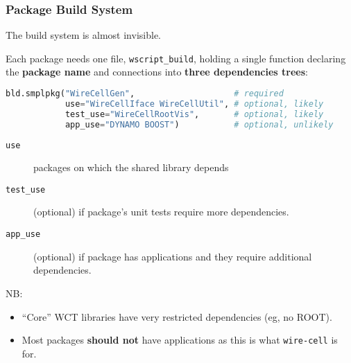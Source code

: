 \documentclass[xcolor=dvipsnames]{beamer}
\begin{document}
\begin{frame}[fragile]
  \frametitle{Package Build System}
  \footnotesize
  The build system is almost invisible.

  Each package needs one file, \texttt{wscript\_build}, holding a single
  function declaring the \textbf{package name} and connections into
  \textbf{three dependencies trees}:

\begin{lstlisting}[language=python]
bld.smplpkg("WireCellGen",                    # required
            use="WireCellIface WireCellUtil", # optional, likely
            test_use="WireCellRootVis",       # optional, likely
            app_use="DYNAMO BOOST")           # optional, unlikely
\end{lstlisting}

  \begin{description}
  \item[\texttt{use}] packages on which the shared library depends
  \item[\texttt{test\_use}] (optional) if package's unit tests require more dependencies.
  \item[\texttt{app\_use}] (optional) if package has applications and
    they require additional dependencies.  
  \end{description}

  \scriptsize NB:
  \begin{itemize}\scriptsize
  \item ``Core'' WCT libraries have very restricted dependencies (eg,
    no ROOT).  
  \item Most packages \textbf{should not} have applications as this is
    what \texttt{wire-cell} is for.
  \end{itemize}

\end{frame}
\end{document}
